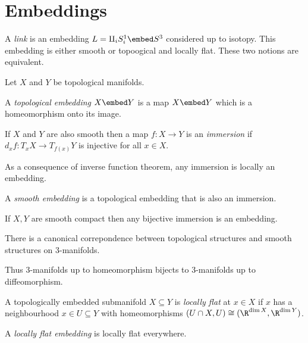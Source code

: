\documentclass[a4paper]{article}
\begin{document}
\section{Embeddings}

\begin{definition}[link]
  A \emph{link} is an embedding \(L = \amalg_i S^1_i \embed S^3\) considered up to isotopy. This embedding is either smooth or topoogical and locally flat. These two notions are equivalent.
\end{definition}

Let \(X\) and \(Y\) be topological manifolds.

\begin{definition}
  A \emph{topological embedding} \(X \embed Y\) is a map \(X \embed Y\) which is a homeomorphism onto its image.
\end{definition}

\begin{definition}[immersion]
  If \(X\) and \(Y\) are also smooth then a map \(f: X \to Y\) is an \emph{immersion} if \(d_xf: T_xX \to T_{f(x)}Y\) is injective for all \(x \in X\).
\end{definition}

As a consequence of inverse function theorem, any immersion is locally an embedding.

\begin{definition}
  A \emph{smooth embedding} is a topological embedding that is also an immersion.
\end{definition}

\begin{corollary}
  If \(X, Y\) are smooth compact then any bijective immersion is an embedding.
\end{corollary}

\begin{theorem}[Moise]
  There is a canonical correpondence between topological structures and smooth structures on 3-manifolds.
\end{theorem}

Thus 3-manifolds up to homeomorphism bijects to 3-manifolds up to diffeomorphism.

\begin{definition}
  A topologically embedded submanifold \(X \subseteq Y\) is \emph{locally flat} at \(x \in X\) if \(x\) has a neighbourhood \(x \in U \subseteq Y\) with homeomorphisms \((U \cap X, U) \cong (\R^{\dim X}, \R^{\dim Y})\).

  A \emph{locally flat embedding} is locally flat everywhere.
\end{definition}
\end{document}
